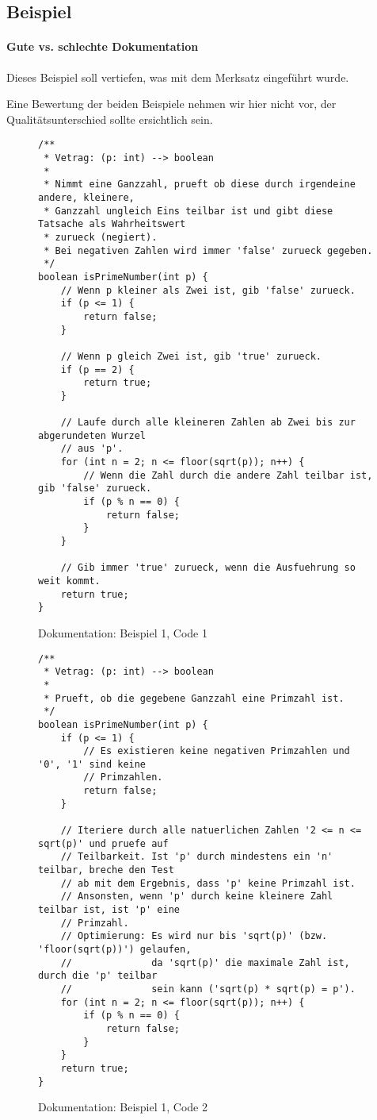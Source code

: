 \subsection{Beispiel}
	\paragraph{Gute vs. schlechte Dokumentation}
		Dieses Beispiel soll vertiefen, was mit dem Merksatz eingeführt wurde.
		
		Eine Bewertung der beiden Beispiele nehmen wir hier nicht vor, der Qualitätsunterschied sollte ersichtlich sein.
		
		\begin{figure}[H]
			\centering
			\begin{lstlisting}
/**
 * Vetrag: (p: int) --> boolean
 *
 * Nimmt eine Ganzzahl, prueft ob diese durch irgendeine andere, kleinere,
 * Ganzzahl ungleich Eins teilbar ist und gibt diese Tatsache als Wahrheitswert
 * zurueck (negiert).
 * Bei negativen Zahlen wird immer 'false' zurueck gegeben.
 */
boolean isPrimeNumber(int p) {
	// Wenn p kleiner als Zwei ist, gib 'false' zurueck.
	if (p <= 1) {
		return false;
	}

	// Wenn p gleich Zwei ist, gib 'true' zurueck.
	if (p == 2) {
		return true;
	}

	// Laufe durch alle kleineren Zahlen ab Zwei bis zur abgerundeten Wurzel
	// aus 'p'.
	for (int n = 2; n <= floor(sqrt(p)); n++) {
		// Wenn die Zahl durch die andere Zahl teilbar ist, gib 'false' zurueck.
		if (p % n == 0) {
			return false;
		}
	}

	// Gib immer 'true' zurueck, wenn die Ausfuehrung so weit kommt.
	return true;
}
			\end{lstlisting}
			\caption{Dokumentation: Beispiel 1, Code 1}
		\end{figure}

		\begin{figure}[H]
			\centering
			\begin{lstlisting}
/**
 * Vetrag: (p: int) --> boolean
 *
 * Prueft, ob die gegebene Ganzzahl eine Primzahl ist.
 */
boolean isPrimeNumber(int p) {
	if (p <= 1) {
		// Es existieren keine negativen Primzahlen und '0', '1' sind keine
		// Primzahlen.
		return false;
	}

	// Iteriere durch alle natuerlichen Zahlen '2 <= n <= sqrt(p)' und pruefe auf
	// Teilbarkeit. Ist 'p' durch mindestens ein 'n' teilbar, breche den Test
	// ab mit dem Ergebnis, dass 'p' keine Primzahl ist.
	// Ansonsten, wenn 'p' durch keine kleinere Zahl teilbar ist, ist 'p' eine
	// Primzahl.
	// Optimierung: Es wird nur bis 'sqrt(p)' (bzw. 'floor(sqrt(p))') gelaufen,
	//              da 'sqrt(p)' die maximale Zahl ist, durch die 'p' teilbar
	//              sein kann ('sqrt(p) * sqrt(p) = p').
	for (int n = 2; n <= floor(sqrt(p)); n++) {
		if (p % n == 0) {
			return false;
		}
	}
	return true;
}
			\end{lstlisting}
			\caption{Dokumentation: Beispiel 1, Code 2}
		\end{figure}
